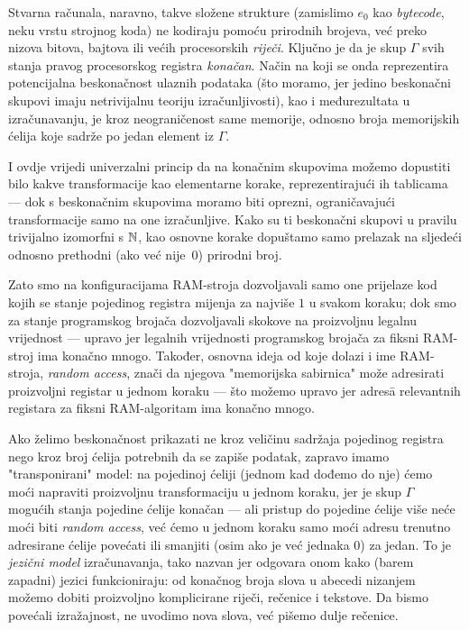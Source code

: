 Stvarna računala, naravno, takve složene strukture (zamislimo $e_0$ kao \emph{bytecode}, neku vrstu strojnog koda) ne kodiraju pomoću prirodnih brojeva, već preko nizova bitova, bajtova ili većih procesorskih \emph{riječi}. Ključno je da je skup $\Gamma$ svih stanja pravog procesorskog registra \emph{konačan}. Način na koji se onda reprezentira potencijalna beskonačnost ulaznih podataka (što moramo, jer jedino beskonačni skupovi imaju netrivijalnu teoriju izračunljivosti), kao i međurezultata u izračunavanju, je kroz neograničenost same memorije, odnosno broja memorijskih ćelija koje sadrže po jedan element iz $\Gamma$.

I ovdje vrijedi univerzalni princip da na konačnim skupovima možemo dopustiti bilo kakve transformacije kao elementarne korake, reprezentirajući ih tablicama --- dok s beskonačnim skupovima moramo biti oprezni, ograničavajući transformacije samo na one izračunljive. Kako su ti beskonačni skupovi u pravilu trivijalno izomorfni s ${\mathbb N}$, kao osnovne korake dopuštamo samo prelazak na sljedeći odnosno prethodni (ako već nije~$0$) prirodni broj.

Zato smo na konfiguracijama RAM-stroja dozvoljavali samo one prijelaze kod kojih se stanje pojedinog registra mijenja za najviše $1$ u svakom koraku; dok smo za stanje programskog brojača dozvoljavali skokove na proizvoljnu legalnu vrijednost --- upravo jer legalnih vrijednosti programskog brojača za fiksni RAM-stroj ima konačno mnogo. Također, osnovna ideja od koje dolazi i ime RAM-stroja, \emph{random access}, znači da njegova "memorijska sabirnica" može adresirati proizvoljni registar u jednom koraku --- što možemo upravo jer adres\=a relevantnih registara za fiksni RAM-algoritam ima konačno mnogo.

Ako želimo beskonačnost prikazati ne kroz veličinu sadržaja pojedinog registra nego kroz broj ćelija potrebnih da se zapiše podatak, zapravo imamo "transponirani" model: na pojedinoj ćeliji (jednom kad dođemo do nje) ćemo moći napraviti proizvoljnu transformaciju u jednom koraku, jer je skup $\Gamma$ mogućih stanja pojedine ćelije konačan --- ali pristup do pojedine ćelije više neće moći biti \emph{random access}, već ćemo u jednom koraku samo moći adresu trenutno adresirane ćelije povećati ili smanjiti (osim ako je već jednaka $0$) za jedan. To je \emph{jezični model} izračunavanja, tako nazvan jer odgovara onom kako (barem zapadni) jezici funkcioniraju: od konačnog broja slova u abecedi nizanjem možemo dobiti proizvoljno komplicirane riječi, rečenice i tekstove. Da bismo povećali izražajnost, ne uvodimo nova slova, već pišemo dulje rečenice.

